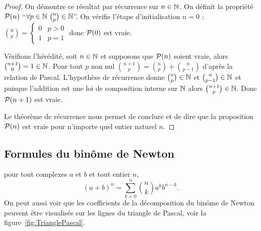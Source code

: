 \begin{proof}
  On démontre ce résultat par récurrence sur \(n\in\N\). On définit la 
  propriété \(\P(n)\) ``\(\forall p \in \N \ \binom{n}{p}\in\N\)''. On vérifie 
  l'étape d'initialisation \(n = 0\) : \(\binom{0}{p} = 
  \begin{cases}
    0 & p>0 \\
    1 & p = 1
  \end{cases}
  \) donc \(\P(0)\) est vraie. 

  Vérifions l'hérédité, soit \(n \in \N\) et supposons que \(\P(n)\) soient 
  vraie, alors \(\binom{n + 1}{0} = 1\in \N\). Pour tout \(p\) non nul 
  \(\binom{n + 1}{p} = \binom{n}{p}+\binom{n}{p - 1}\) d'après la relation de 
  Pascal.  L'hypothèse de récurrence donne \(\binom{n}{p}\in\N\) et 
  \(\binom{n}{p - 1}\in\N\) et puisque l'addition est une loi de composition 
  interne sur \(\N\) alors \(\binom{n + 1}{p}\in\N\). Donc \(\P(n + 1)\) est 
  vraie. 

  Le théorème de récurrence nous permet de conclure et de dire que la 
  proposition \(\P(n)\) est vraie pour n'importe quel entier naturel \(n\).
\end{proof}

\subsection{Formules du binôme de Newton}

\begin{prop}
  pour tout complexes \(a\) et \(b\) et tout entier \(n\),
  \begin{equation}
    (a + b)^n = \sum_{k = 0}^n \binom{n}{k}a^kb^{n - k}.
  \end{equation}
  On peut aussi voir que les coefficients de la décomposition du binôme de 
  Newton peuvent être visualisés sur les lignes du triangle de Pascal, voir 
  la figure~\ref{fig:TrianglePascal}.
\end{prop}

